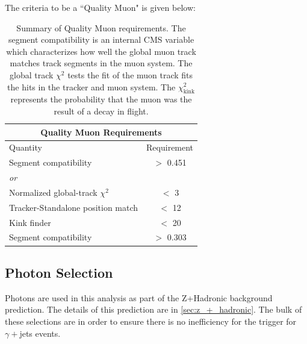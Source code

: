     The criteria to be a ``Quality Muon" is given below:
    \begin{table}[!h]
      \begin{center}
        \caption[Summary of Quality Muon requirements.]{\label{table:muons} Summary of Quality Muon requirements. The segment compatibility is an internal CMS variable which characterizes how well the global muon track matches track segments in the muon system. The global track $\chi^2$ tests the fit of the muon track fits the hits in the tracker and muon system. The $\chi^2_\text{kink}$ represents the probability that the muon was the result of a decay in flight.}
        \begin{tabular}{l|c}
          \hline
          \hline
          \multicolumn{2}{c}{Quality Muon Requirements} \\
          \hline
          Quantity   &  Requirement \\
          \hline
          Segment compatibility             &$>$ 0.451 \\
          \hline
          \emph{or} & \\
          \hline
          Normalized global-track $\chi^2$  & $<$ 3    \\
          Tracker-Standalone position match & $<$ 12   \\
          Kink finder                       & $<$ 20   \\
          Segment compatibility             & $>$ 0.303 \\
          \hline
          \hline
        \end{tabular}
      \end{center}
    \end{table}

  \newpage

  \subsection{Photon Selection} \label{sec:photon_selection}

    Photons are used in this analysis as part of the Z+Hadronic background prediction. The details of this prediction are in \ref{sec:z_+_hadronic}. The bulk of these selections are in order to ensure there is no inefficiency for the trigger for $\gamma +$jets events.

